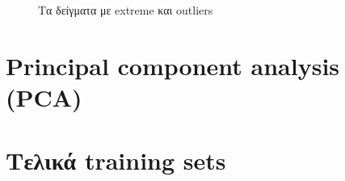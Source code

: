   \begin{figure}[h!]
	\centering
	\caption{Τα δείγματα με extreme και outliers}
\end{figure}
 \section { Principal component analysis (PCA)}
 \section{Τελικά training sets}
